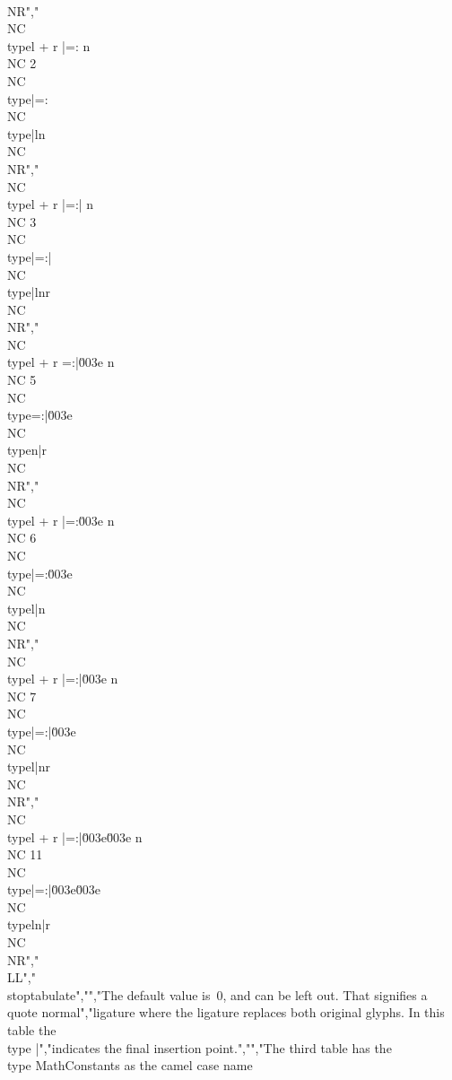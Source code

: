 \\NR","\\NC \\type{l + r |=: n}    \\NC 2      \\NC \\type{|=:}    \\NC \\type{|ln}  \\NC \\NR","\\NC \\type{l + r |=:| n}   \\NC 3      \\NC \\type{|=:|}   \\NC \\type{|lnr} \\NC \\NR","\\NC \\type{l + r  =:|\u003e n}  \\NC 5      \\NC \\type{=:|\u003e}   \\NC \\type{n|r}  \\NC \\NR","\\NC \\type{l + r |=:\u003e n}   \\NC 6      \\NC \\type{|=:\u003e}   \\NC \\type{l|n}  \\NC \\NR","\\NC \\type{l + r |=:|\u003e n}  \\NC 7      \\NC \\type{|=:|\u003e}  \\NC \\type{l|nr} \\NC \\NR","\\NC \\type{l + r |=:|\u003e\u003e n} \\NC 11     \\NC \\type{|=:|\u003e\u003e} \\NC \\type{ln|r} \\NC \\NR","\\LL","\\stoptabulate","","The default value is~0, and can be left out. That signifies a \\quote {normal}","ligature where the ligature replaces both original glyphs. In this table the~\\type {|}","indicates the final insertion point.","","The third table has the \\type {MathConstants} as the camel case name 